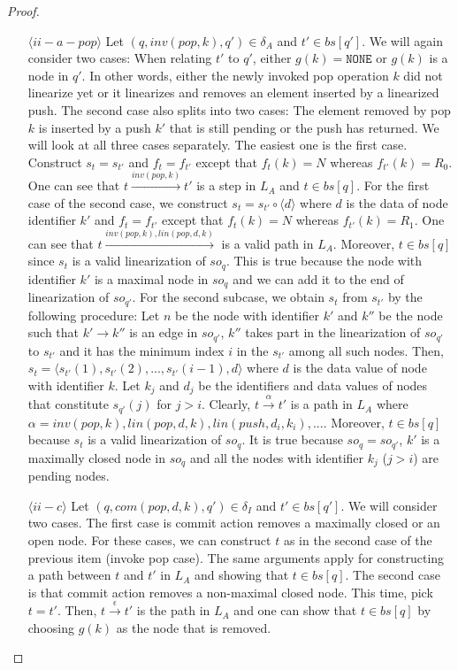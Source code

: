 \begin{proof}
\begin{itemize}
\item[$\langle ii-a-pop \rangle$] Let $(q, inv(pop,k),q') \in \delta_A$ and $t' \in bs[q']$. We will again consider two cases: When relating $t'$ to $q'$, either $g(k) = \texttt{NONE}$ or $g(k)$ is a node in $q'$. In other words, either the newly invoked pop operation $k$ did not linearize yet or it linearizes and removes an element inserted by a linearized push. The second case also splits into two cases: The element removed by pop $k$ is inserted by a push $k'$ that is still pending or the push has returned. We will look at all three cases separately. The easiest one is the first case. Construct $s_t=s_{t'}$ and $f_t = f_{t'}$ except that $f_t(k) = N$ whereas $f_{t'}(k)= R_0$. One can see that $t \xrightarrow{inv(pop,k)} t'$ is a step in $L_A$ and $t \in bs[q]$. For the first case of the second case, we construct $s_t = s_{t'} \circ \langle d \rangle$ where $d$ is the data of node identifier $k'$ and $f_t = f_{t'}$ except that $f_t(k) = N$ whereas $f_{t'}(k) = R_1$. One can see that $t \xrightarrow{inv(pop,k), lin(pop,d,k)}$ is a valid path in $L_A$. Moreover, $t \in bs[q]$ since $s_t$ is a valid linearization of $so_q$. This is true because the node with identifier $k'$ is a maximal node in $so_q$ and we can add it to the end of linearization of $so_{q'}$. For the second subcase, we obtain $s_t$   from $s_{t'}$ by the following procedure: Let $n$ be the node with identifier $k'$ and $k''$ be the node such that $k' \rightarrow k''$ is an edge in $so_{q'}$, $k''$ takes part in the linearization of $so_{q'}$ to $s_{t'}$ and it has the minimum index $i$ in the $s_{t'}$ among all such nodes. Then, $s_t = \langle s_{t'}(1), s_{t'}(2),..., s_{t'}(i-1), d \rangle$ where $d$ is the data value of node with identifier $k$. Let $k_j$ and $d_j$ be the identifiers and data values of nodes that constitute $s_{q'}(j)$ for $j>i$. Clearly, $t \xrightarrow{\alpha} t'$ is a path in $L_A$ where $\alpha = inv(pop,k), lin(pop,d,k), lin(push, d_i, k_i),...$. Moreover, $t \in bs[q]$ because $s_t$ is a valid linearization of $so_q$. It is true because $so_q = so_{q'}$, $k'$ is a maximally closed node in $so_q$ and all the nodes with identifier $k_j$ ($j>i$) are pending nodes.
\item[$\langle ii-c \rangle$] Let $(q, com(pop,d,k), q') \in \delta_I$ and $t' \in bs[q']$. We will consider two cases. The first case is commit action removes a maximally closed or an open node. For these cases, we can construct $t$ as in the second case of the previous item (invoke pop case). The same arguments apply for constructing a path between $t$ and $t'$ in $L_A$ and showing that $t \in bs[q]$.  The second case is that commit action removes a non-maximal closed node. This time, pick $t = t'$. Then, $t \xrightarrow{\epsilon} t'$ is the path in $L_A$ and one can show that $t \in bs[q]$ by choosing $g(k)$ as the node that is removed. 

\end{itemize}
\end{proof}
